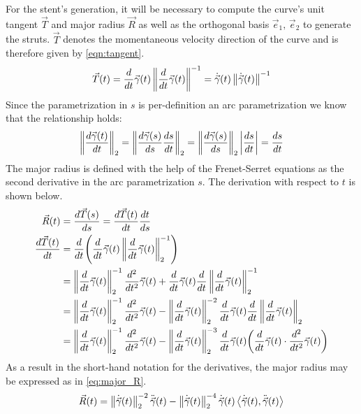 For the stent's generation, it will be necessary to compute the curve's unit tangent $\vec{T}$ and major radius $\vec{R}$ as well as the orthogonal basis $\vec{e}_1,\,\vec{e}_2$ to generate the struts. $\vec{T}$ denotes the momentaneous velocity direction of the curve and is therefore given by \autoref{eqn:tangent}.
\begin{equation}
	\vec{T}(t) = \frac{d}{dt}\vec{\gamma}(t)\left\lVert\frac{d}{dt}\vec{\gamma}(t)\right\rVert^{-1} = \dot{\vec{\gamma}}(t)\left\lVert\dot{\vec{\gamma}}(t)\right\rVert^{-1}
	\label{eqn:tangent}
\end{equation}
Since the parametrization in $s$ is per-definition an arc parametrization we know that the relationship holds:
\begin{equation*}
	\left\lVert\frac{d \vec{\gamma}(t) }{dt}\right\rVert_2 = \left\lVert\frac{d\vec{\gamma}(s)}{ds}{\frac{ds}{dt}}\right\rVert_2 = \left\lVert\frac{d\vec{\gamma}(s)}{ds}\right\rVert_2\left\lvert \frac{ds}{dt} \right\rvert=\frac{ds}{dt}
\end{equation*}
The major radius is defined with the help of the Frenet-Serret equations as the second derivative in the arc parametrization $s$. The derivation with respect to $t$ is shown below.
\begin{align*}
	\vec{R}(t)             & = \frac{d\vec{T}(s)}{ds} = \frac{d\vec{T}(t)}{dt} \frac{dt}{ds}                                                                                                                                                                  \\
	\frac{d\vec{T}(t)}{dt} & = \frac{d}{dt}{\left(\frac{d}{dt}\vec{\gamma}(t)\left\lVert\frac{d}{dt}\vec{\gamma}(t)\right\rVert^{-1}_2\right)}                                                                                                                                \\
	                       & = \left\lVert\frac{d}{dt}\vec{\gamma}(t)\right\rVert^{-1}_2\frac{d^2}{dt^2}\vec{\gamma}(t) + \frac{d}{dt}\vec{\gamma}(t) \frac{d}{dt}\left\lVert\frac{d}{dt}\vec{\gamma}(t)\right\rVert^{-1}_2                                                                   \\
	                       & = \left\lVert\frac{d}{dt}\vec{\gamma}(t)\right\rVert^{-1}_2\frac{d^2}{dt^2}\vec{\gamma}(t) - \left\lVert\frac{d}{dt}\vec{\gamma}(t)\right\rVert^{-2}_2\frac{d}{dt}\vec{\gamma}(t) \frac{d}{dt}\left\lVert\frac{d}{dt}\vec{\gamma}(t)\right\rVert_2                               \\
	                       & = \left\lVert\frac{d}{dt}\vec{\gamma}(t)\right\rVert^{-1}_2\frac{d^2}{dt^2}\vec{\gamma}(t) - \left\lVert\frac{d}{dt}\vec{\gamma}(t)\right\rVert^{-3}_2\frac{d}{dt}\vec{\gamma}(t) {\left(\frac{d}{dt}\vec{\gamma}(t)\cdot\frac{d^2}{dt^2}\vec{\gamma}(t)\right)}
\end{align*}
As a result in the short-hand notation for the derivatives, the major radius may be expressed as in \autoref{eq:major_R}.
\begin{equation}
	\vec{R}(t) = \left\lVert\dot{\vec{\gamma}}(t)\right\rVert^{-2}_2\ddot{\vec{\gamma}}(t) - \left\lVert\dot{\vec{\gamma}}(t)\right\rVert^{-4}_2\dot{\vec{\gamma}}(t) \left\langle \dot{\vec{\gamma}}(t),\ddot{\vec{\gamma}}(t) \right\rangle
	\label{eq:major_R}
\end{equation}

